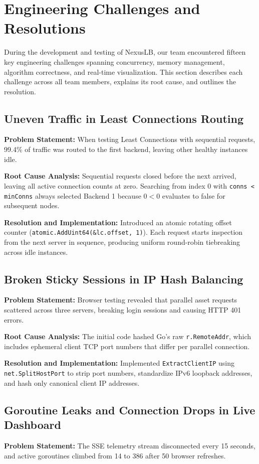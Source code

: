 \documentclass[12pt,openany]{report}
\begin{document}
\section{Engineering Challenges and Resolutions}

During the development and testing of NexusLB, our team encountered fifteen key engineering challenges spanning concurrency, memory management, algorithm correctness, and real-time visualization. This section describes each challenge across all team members, explains its root cause, and outlines the resolution.

\subsection{Uneven Traffic in Least Connections Routing}
\textbf{Problem Statement:} When testing Least Connections with sequential requests, 99.4\% of traffic was routed to the first backend, leaving other healthy instances idle.

\textbf{Root Cause Analysis:} Sequential requests closed before the next arrived, leaving all active connection counts at zero. Searching from index 0 with \texttt{conns < minConns} always selected Backend 1 because $0 < 0$ evaluates to false for subsequent nodes.

\textbf{Resolution and Implementation:} Introduced an atomic rotating offset counter (\texttt{atomic.AddUint64(\&lc.offset, 1)}). Each request starts inspection from the next server in sequence, producing uniform round-robin tiebreaking across idle instances.

\subsection{Broken Sticky Sessions in IP Hash Balancing}
\textbf{Problem Statement:} Browser testing revealed that parallel asset requests scattered across three servers, breaking login sessions and causing HTTP 401 errors.

\textbf{Root Cause Analysis:} The initial code hashed Go's raw \texttt{r.RemoteAddr}, which includes ephemeral client TCP port numbers that differ per parallel connection.

\textbf{Resolution and Implementation:} Implemented \texttt{ExtractClientIP} using \texttt{net.SplitHostPort} to strip port numbers, standardize IPv6 loopback addresses, and hash only canonical client IP addresses.

\subsection{Goroutine Leaks and Connection Drops in Live Dashboard}
\textbf{Problem Statement:} The SSE telemetry stream disconnected every 15 seconds, and active goroutines climbed from 14 to 386 after 50 browser refreshes.
\end{document}
